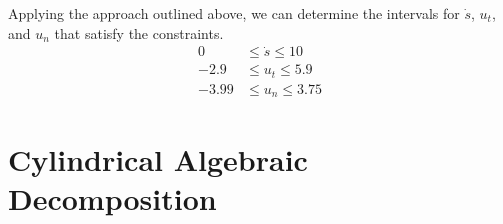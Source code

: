 Applying the approach outlined above, we can determine the intervals for $\dot{s}$, $u_t$, and $u_n$ that satisfy the constraints.
\begin{align*}
	0     & \leq \dot{s} \leq 10 \\
	-2.9  & \leq u_t \leq 5.9    \\
	-3.99 & \leq u_n \leq 3.75
\end{align*}

\section{Cylindrical Algebraic Decomposition}


